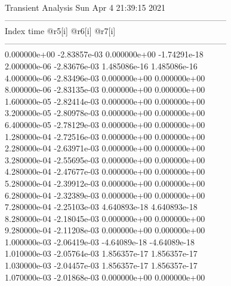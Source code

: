                                   Transient Analysis  Sun Apr  4 21:39:15  2021\\ \hline
--------------------------------------------------------------------------------\\ \hline
Index   time            @r5[i]          @r6[i]          @r7[i]          \\ \hline
--------------------------------------------------------------------------------\\ 	0.000000e+00	-2.83857e-03	0.000000e+00	-1.74291e-18	\\ 	2.000000e-06	-2.83676e-03	1.485086e-16	1.485086e-16	\\ 	4.000000e-06	-2.83496e-03	0.000000e+00	0.000000e+00	\\ 	8.000000e-06	-2.83135e-03	0.000000e+00	0.000000e+00	\\ 	1.600000e-05	-2.82414e-03	0.000000e+00	0.000000e+00	\\ 	3.200000e-05	-2.80978e-03	0.000000e+00	0.000000e+00	\\ 	6.400000e-05	-2.78129e-03	0.000000e+00	0.000000e+00	\\ 	1.280000e-04	-2.72516e-03	0.000000e+00	0.000000e+00	\\ 	2.280000e-04	-2.63971e-03	0.000000e+00	0.000000e+00	\\ 	3.280000e-04	-2.55695e-03	0.000000e+00	0.000000e+00	\\ 	4.280000e-04	-2.47677e-03	0.000000e+00	0.000000e+00	\\ 	5.280000e-04	-2.39912e-03	0.000000e+00	0.000000e+00	\\ 	6.280000e-04	-2.32389e-03	0.000000e+00	0.000000e+00	\\ 	7.280000e-04	-2.25103e-03	4.640893e-18	4.640893e-18	\\ 	8.280000e-04	-2.18045e-03	0.000000e+00	0.000000e+00	\\ 	9.280000e-04	-2.11208e-03	0.000000e+00	0.000000e+00	\\ 	1.000000e-03	-2.06419e-03	-4.64089e-18	-4.64089e-18	\\ 	1.010000e-03	-2.05764e-03	1.856357e-17	1.856357e-17	\\ 	1.030000e-03	-2.04457e-03	1.856357e-17	1.856357e-17	\\ 	1.070000e-03	-2.01868e-03	0.000000e+00	0.000000e+00	\\ \hline
